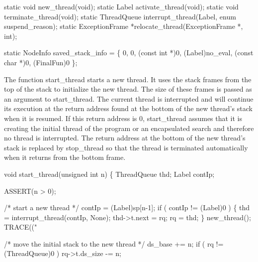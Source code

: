 \nwendcode{}\nwdocspar
\nwenddocs{}\plusendmoddef\nwstartdeflinemarkup{}\nwenddeflinemarkup
static void new_thread(void);
static Label activate_thread(void);
static void terminate_thread(void);
static ThreadQueue interrupt_thread(Label, enum suspend_reason);
static ExceptionFrame *relocate_thread(ExceptionFrame *, int);

static NodeInfo saved_stack_info = \{
    0, 0, (const int *)0, (Label)no_eval, (const char *)0, (FinalFun)0
\};

\nwendcode{}\nwdocspar
The function {\Tt{}start{\_}thread\nwendquote} starts a new thread. It uses the stack
frames from the top of the stack to initialize the new thread. The
size of these frames is passed as an argument to {\Tt{}start{\_}thread\nwendquote}. The
current thread is interrupted and will continue its execution at the
return address found at the bottom of the new thread's stack when it
is resumed. If this return address is {\Tt{}0\nwendquote}, {\Tt{}start{\_}thread\nwendquote} assumes
that it is creating the initial thread of the program or an
encapsulated search and therefore no thread is interrupted. The return
address at the bottom of the new thread's stack is replaced by
{\Tt{}stop{\_}thread\nwendquote} so that the thread is terminated automatically when it
returns from the bottom frame.

\nwenddocs{}\plusendmoddef\nwstartdeflinemarkup{}\nwenddeflinemarkup
void
start_thread(unsigned int n)
\{
    ThreadQueue thd;
    Label       contIp;

    ASSERT(n > 0);

    /* start a new thread */
    contIp = (Label)sp[n-1];
    if ( contIp != (Label)0 )
    \{
        thd         = interrupt_thread(contIp, None);
        thd->t.next = rq;
        rq          = thd;
    \}
    new_thread();
    TRACE(("%

    /* move the initial stack to the new thread */
    ds_base += n;
    if ( rq != (ThreadQueue)0 )
        rq->t.ds_size -= n;

